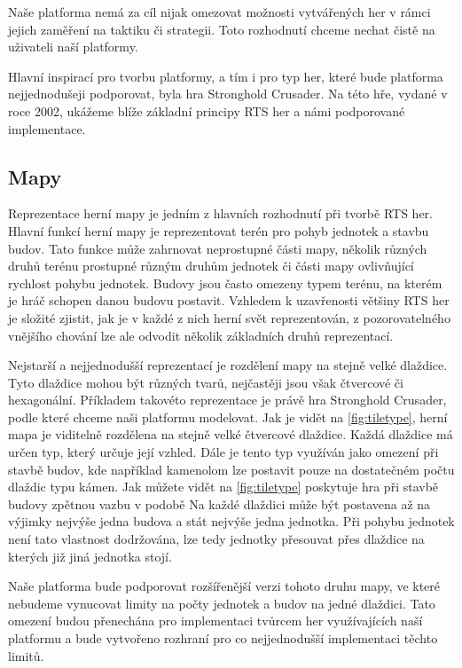 Naše platforma nemá za cíl nijak omezovat možnosti vytvářených her v rámci jejich zaměření na taktiku či strategii. Toto rozhodnutí chceme nechat čistě na uživateli naší platformy.


Hlavní inspirací pro tvorbu platformy, a tím i pro typ her, které bude platforma nejjednodušeji podporovat, byla hra Stronghold Crusader. Na této hře, vydané v roce 2002, ukážeme blíže základní principy RTS her a námi podporované implementace.

\subsection{Mapy}
Reprezentace herní mapy je jedním z hlavních rozhodnutí při tvorbě RTS her. Hlavní funkcí herní mapy je reprezentovat terén pro pohyb jednotek a stavbu budov. 
Tato funkce může zahrnovat neprostupné části mapy, několik různých druhů terénu prostupné různým druhům jednotek či části mapy ovlivňující rychlost pohybu jednotek.
Budovy jsou často omezeny typem terénu, na kterém je hráč schopen danou budovu postavit. Vzhledem k uzavřenosti většiny RTS her je složité zjistit, jak je v každé z nich herní svět reprezentován, z pozorovatelného vnějšího chování lze ale odvodit několik základních druhů reprezentací. 

Nejstarší a nejjednodušší reprezentací je rozdělení mapy na stejně velké dlaždice. Tyto dlaždice mohou být různých tvarů, nejčastěji jsou však čtvercové či hexagonální. Příkladem takovéto reprezentace je právě hra Stronghold Crusader, podle které chceme naši platformu modelovat. Jak je vidět na \ref{fig:tiletype}, herní mapa je viditelně rozdělena na stejně velké čtvercové dlaždice. Každá dlaždice má určen typ, který určuje její vzhled. Dále je tento typ využíván jako omezení při stavbě budov, kde například kamenolom lze postavit pouze na dostatečném počtu dlaždic typu kámen. Jak můžete vidět na \ref{fig:tiletype} poskytuje hra při stavbě budovy zpětnou vazbu v podobě  Na každé dlaždici může být postavena až na výjimky nejvýše jedna budova a stát nejvýše jedna jednotka. Při pohybu jednotek není tato vlastnost dodržována, lze tedy jednotky přesouvat přes dlaždice na kterých již jiná jednotka stojí. 

Naše platforma bude podporovat rozšířenější verzi tohoto druhu mapy, ve které nebudeme vynucovat limity na počty jednotek a budov na jedné dlaždici. Tato omezení budou přenechána pro implementaci tvůrcem her využívajících naší platformu a bude vytvořeno rozhraní pro co nejjednodušší implementaci těchto limitů.
